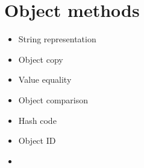 \documentclass{KodeBook}
\begin{document}
\section{Object methods}

\begin{itemize}
	\item String representation
	\item Object copy
	\item Value equality
	\item Object comparison
	\item Hash code
	\item Object ID
	\item 
\end{itemize}







\ifx\wholebook\relax\else
% 
% 
	
\end{document}
